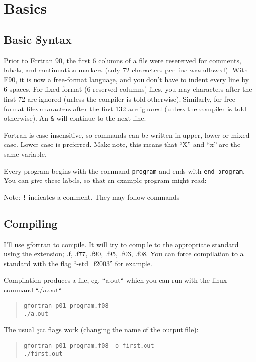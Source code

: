 
\section{Basics}

\subsection{Basic Syntax}
Prior to Fortran 90, the first 6 columns of a file were resererved for comments, labels, and continuation markers (only 72 characters per line was allowed).
 With F90, it is now a free-format language, and you don't have to indent every line by 6 spaces.
 For fixed format (6-reserved-columns) files, you may characters after the first 72 are ignored (unless the compiler is told otherwise).
 Similarly, for free-format files characters after the first 132 are ignored (unless the compiler is told otherwise).
 An \texttt{{\&}} will continue to the next line.

Fortran is case-insensitive, so commands can be written in upper, lower or mixed case. Lower case is preferred. Make note, this means that ``X'' and ``x'' are the same variable.

Every program begins with the command \texttt{program} and ends with \texttt{end program}. You can give these labels, so that an example program might read:
\begin{quote}

\end{quote}
Note: \texttt{!} indicates a comment. They may follow commands


\subsection{Compiling}
I'll use gfortran to compile. It will try to compile to the appropriate standard using the extension; .f, .f77, .f90, .f95, .f03, .f08. You can force compilation to a standard with the flag ``-std=f2003'' for example.

Compilation produces a file, eg. ``a.out`` which you can run with the linux command ``./a.out``
\begin{quote}
\begin{verbatim}
gfortran p01_program.f08
./a.out
\end{verbatim}
\end{quote}

The usual gcc flags work (changing the name of the output file):
\begin{quote}
\begin{verbatim}
gfortran p01_program.f08 -o first.out
./first.out
\end{verbatim}
\end{quote}


